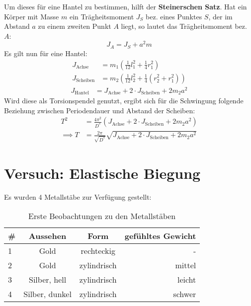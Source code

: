Um dieses für eine Hantel zu bestimmen, hilft der \textbf{Steinerschen Satz}. Hat ein Körper mit Masse $m$ ein Trägheitsmoment $J_S$ bez. eines Punktes $S$, der im Abstand $a$ zu einem zweiten Punkt $A$ liegt, so lautet das Trägheitsmoment bez. $A$:
\begin{equation}
  J_A=J_S+a^2m
  \label{eq:steiner}
\end{equation}
Es gilt nun für eine Hantel:
\begin{align}
  J_{\text{Achse}}&=m_1\left( \frac{1}{12}l_1^2+\frac{1}{4}r_1^2 \right) \\
  J_{\text{Scheiben}}&=m_2\left(\frac{1}{12}l_2^2+\frac{1}{4}(r_2^2+r_1^2)\right)
  \label{eq:achsescheibe}
\end{align}
\begin{align}
  J_{\text{Hantel}}&=J_{\text{Achse}}+2\cdot J_{\text{Scheiben}}+2m_2a^2
  \label{eq:hantel}
\end{align}
Wird diese als Torsionspendel genutzt, ergibt sich für die Schwingung folgende Beziehung zwischen Periodendauer und Abstand der Scheiben:
\begin{align}
  T^2&=\frac{4\pi^2}{D^*}(J_{\text{Achse}}+2\cdot J_{\text{Scheiben}}+2m_2a^2) \\
  \implies T&=\frac{2\pi}{\sqrt{D^*}}\sqrt{J_{\text{Achse}}+2\cdot J_{\text{Scheiben}}+2m_2a^2}
  \label{eq:hanteldauer}
\end{align}
\section{Versuch: Elastische Biegung}
Es wurden 4 Metallstäbe zur Verfügung gestellt:
\begin{table}[h]
  \centering
  \begin{tabular}{l | c | c | r}
    \# & Aussehen & Form & gefühltes Gewicht \\ \hline
    1 & Gold & rechteckig & - \\
    2 & Gold & zylindrisch & mittel \\
    3 & Silber, hell & zylindrisch & leicht \\
    4 & Silber, dunkel & zylindrisch & schwer
  \end{tabular}
  \caption{Erste Beobachtungen zu den Metallstäben}
  \label{tab:metall_beob}
\end{table}

